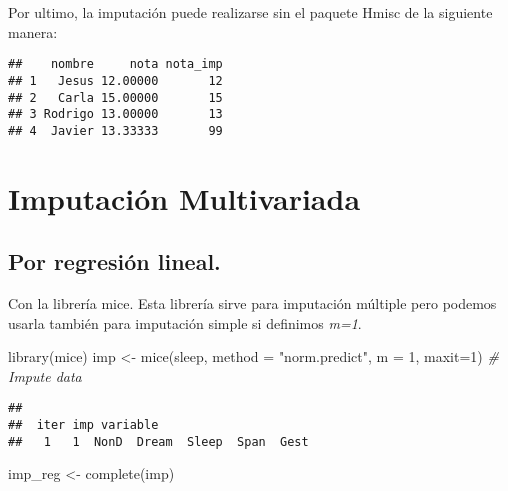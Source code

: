\documentclass[
]{article}
\newenvironment{Shaded}{\begin{snugshade}}{\end{snugshade}}
\newcommand{\AttributeTok}[1]{\textcolor[rgb]{0.77,0.63,0.00}{#1}}
\newcommand{\CommentTok}[1]{\textcolor[rgb]{0.56,0.35,0.01}{\textit{#1}}}
\newcommand{\DecValTok}[1]{\textcolor[rgb]{0.00,0.00,0.81}{#1}}
\newcommand{\FunctionTok}[1]{\textcolor[rgb]{0.00,0.00,0.00}{#1}}
\newcommand{\NormalTok}[1]{#1}
\newcommand{\OtherTok}[1]{\textcolor[rgb]{0.56,0.35,0.01}{#1}}
\newcommand{\SpecialCharTok}[1]{\textcolor[rgb]{0.00,0.00,0.00}{#1}}
\newcommand{\StringTok}[1]{\textcolor[rgb]{0.31,0.60,0.02}{#1}}
\begin{document}
Por ultimo, la imputación puede realizarse sin el paquete Hmisc de la
siguiente manera:

\begin{Shaded}
\end{Shaded}

\begin{verbatim}
##    nombre     nota nota_imp
## 1   Jesus 12.00000       12
## 2   Carla 15.00000       15
## 3 Rodrigo 13.00000       13
## 4  Javier 13.33333       99
\end{verbatim}

\hypertarget{imputaciuxf3n-multivariada}{%
\section{Imputación Multivariada}\label{imputaciuxf3n-multivariada}}

\hypertarget{por-regresiuxf3n-lineal.}{%
\subsection{Por regresión lineal.}\label{por-regresiuxf3n-lineal.}}

Con la librería mice. Esta librería sirve para imputación múltiple pero
podemos usarla también para imputación simple si definimos \emph{m=1}.

\begin{Shaded}
\begin{Highlighting}[]
\FunctionTok{library}\NormalTok{(mice) }
\NormalTok{imp }\OtherTok{\textless{}{-}} \FunctionTok{mice}\NormalTok{(sleep, }\AttributeTok{method =} \StringTok{"norm.predict"}\NormalTok{, }\AttributeTok{m =} \DecValTok{1}\NormalTok{, }\AttributeTok{maxit=}\DecValTok{1}\NormalTok{) }\CommentTok{\# Impute data}
\end{Highlighting}
\end{Shaded}

\begin{verbatim}
## 
##  iter imp variable
##   1   1  NonD  Dream  Sleep  Span  Gest
\end{verbatim}

\begin{Shaded}
\begin{Highlighting}[]
\NormalTok{imp\_reg }\OtherTok{\textless{}{-}} \FunctionTok{complete}\NormalTok{(imp)}
\end{Highlighting}
\end{Shaded}
\end{document}
